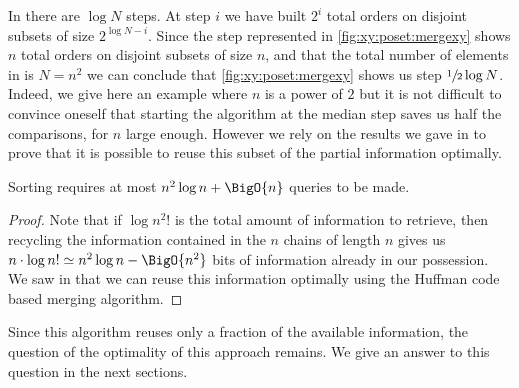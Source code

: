 In \mergesort there are $\log N$ steps. At step $i$ we have
built $2^{i}$ total orders on disjoint subsets of size $2^{\log N - i}$. Since
the step represented in \ref{fig:xy:poset:mergexy} shows $n$ total orders on
disjoint subsets of size $n$, and that the total number of elements in \XY is
$N = n^2$ we can conclude that \ref{fig:xy:poset:mergexy} shows us step
$\sfrac{1}{2} \log N$. Indeed, we give here an example where \(n\) is a power
of \(2\)
but it is not difficult to convince oneself that starting
the algorithm at the median step
saves us half the comparisons, for \(n\) large enough. However we rely on the
results we gave in  to prove that it is possible to
reuse this subset of the partial information optimally.
\begin{theorem}
Sorting \XY requires at most \(n^2 \log n + \BigO{n}\) queries to be made.
\end{theorem}
\begin{proof}
Note that if \(\log n^2!\) is the total amount of information to retrieve,
then recycling the information contained in the \(n\) chains of length \(n\)
gives us \(n \cdot \log n! \simeq n^2 \log n - \BigO{n^2}\) bits of information already in our
possession. We saw in  that we can reuse this information optimally using
the Huffman code based merging algorithm.
\end{proof}

Since this algorithm reuses only a fraction of the available information, the
question of the optimality of this approach remains. We give an answer to this
question in the next sections.

